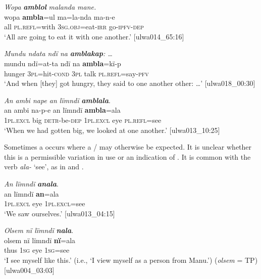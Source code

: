 \ea%
    \label{ex:pron:32}
          \textit{Wopa} \textbf{\textit{amblol}} \textit{malanda mane.}\\
\gll    wopa  \textbf{ambla}=ul    ma=la-nda      ma-n-e\\
    all    \textsc{pl.refl}=with  3\textsc{sg.obj}=eat-\textsc{irr}  go-\textsc{ipfv-dep}\\
\glt `All are going to eat it with one another.’ [ulwa014\_65:16]
\z

\ea%
    \label{ex:pron:33}
          \textit{Mundu ndata ndï na} \textbf{\textit{amblakap}}\textit{: …}\\
\gll    mundu  ndï=at-ta    ndï  na    \textbf{ambla}=kï-p\\
    hunger  3\textsc{pl}=hit-\textsc{cond}  \textsc{3pl}  talk  \textsc{pl.refl}=say-\textsc{pfv}\\
\glt `And when [they] got hungry, they said to one another other: …’ [ulwa018\_00:30]
\z

\ea%
    \label{ex:pron:34}
          \textit{An ambi nape an lïmndï} \textbf{\textit{amblala}}.\\
\gll an      ambi  na-p-e      an      lïmndï  \textbf{ambla}=ala\\
    1\textsc{pl.excl}  big    \textsc{detr-}be\textsc{{}-dep} 1\textsc{pl.excl}  eye    \textsc{pl.refl}=see\\
\glt `When we had gotten big, we looked at one another.’ [ulwa013\_10:25]
\z

Sometimes a  occurs where a /  may otherwise be expected. It is unclear whether this is a permissible variation in  use or an indication of . It is common with the verb \textit{ala-} ‘see’, as in  and .


\ea%
    \label{ex:pron:35}
          \textit{An lïmndï} \textbf{\textit{anala}}.\\
\gll an      lïmndï  \textbf{an}=ala\\
    1\textsc{pl.excl}  eye    \textsc{1pl.excl}=see\\
\glt `We saw ourselves.’ [ulwa013\_04:15]
\z

\ea%
    \label{ex:pron:36}
          \textit{Olsem nï lïmndï} \textbf{\textit{nala}}.\\
\gll olsem  nï    lïmndï  \textbf{nï}=ala\\
    thus  1\textsc{sg}  eye    \textsc{1sg}=see\\
\glt `I see myself like this.’ (i.e., ‘I view myself as a person from Manu.’) (\textit{olsem} = TP) [ulwa004\_03:03]
\z

